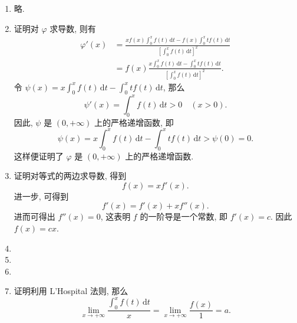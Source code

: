 \documentclass[a4paper, 11pt]{ctexart}
\newcommand{\dif}{\mathrm{d}}
\begin{document}
\begin{enumerate}
    \item %
        略.
    \item %
        {\heiti 证明}\quad 对 $\varphi$ 求导数, 则有
        \begin{align*}
            \varphi'(x) &= \frac{\displaystyle{xf(x)\int_0^x f(t)\,\dif t - f(x)\int_0^x tf(t)\,\dif t}}{\displaystyle{\left[\int_0^x f(t)\,\dif t\right]^2}} \\    
                        &= f(x)\frac{\displaystyle{x\int_0^x f(t)\,\dif t - \int_0^x tf(t)\,\dif t}}{\displaystyle{\left[\int_0^x f(t)\,\dif t\right]^2}}.
        \end{align*}
        令 $\psi(x) = \displaystyle{x\int_0^x f(t)\,\dif t - \int_0^x tf(t)\,\dif t}$, 那么
        \[
            \psi'(x) = \displaystyle{\int_0^x f(t)\,\dif t} > 0\quad (x > 0).    
        \]
        因此, $\psi$ 是 $(0, +\infty)$ 上的严格递增函数, 即
        \[
            \psi(x) = \displaystyle{x\int_0^x f(t)\,\dif t - \int_0^x tf(t)\,\dif t} > \psi(0) = 0.    
        \]
        这样便证明了 $\varphi$ 是 $(0, +\infty)$ 上的严格递增函数.
    \item %
        {\heiti 证明}\quad 对等式的两边求导数, 得到
        \[
            f(x) = xf'(x).    
        \]
        进一步, 可得到
        \[
            f'(x) = f'(x) + xf''(x).    
        \]
        进而可得出 $f''(x) = 0$, 这表明 $f$ 的一阶导是一个常数, 即 $f'(x) = c$. 因此 $f(x) = cx$.
    \item %
    \item %
    \item %
    \item %
        {\heiti 证明}\quad 利用 L'Hospital 法则, 那么
        \[
            \lim_{x\to+\infty}\frac{\displaystyle{\int_0^x f(t)\,\dif t}}{x} = \lim_{x\to+\infty} \frac{f(x)}{1} = a.    
        \]
\end{enumerate}
\end{document}
